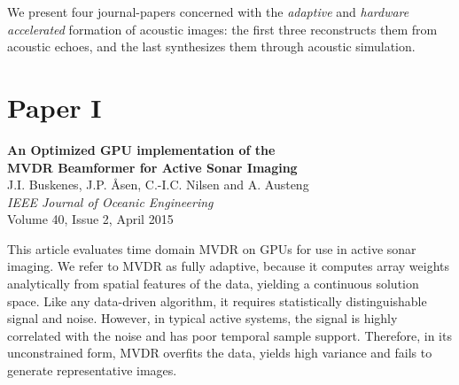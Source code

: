%
% 


We present four journal-papers concerned with the \emph{adaptive} and \emph{hardware accelerated} formation of acoustic images: the first three reconstructs them from acoustic echoes, and the last synthesizes them through acoustic simulation. 

%
%


%

\section{Paper I}\label{sec:paperI} %
\textbf{An Optimized GPU implementation of the\\ MVDR Beamformer for Active Sonar Imaging}\\
J.I. Buskenes, J.P. Åsen, C.-I.C. Nilsen and A. Austeng\\
\textit{IEEE Journal of Oceanic Engineering}\\
Volume 40, Issue 2, April 2015

This article evaluates time domain MVDR on GPUs for use in active sonar imaging. We refer to MVDR as fully adaptive, because it computes array weights analytically from spatial features of the data, yielding a continuous solution space. Like any data-driven algorithm, it requires statistically distinguishable signal and noise. However, in typical active systems, the signal is highly correlated with the noise and has poor temporal sample support. Therefore, in its unconstrained form, MVDR overfits the data, yields high variance and fails to generate representative images.

